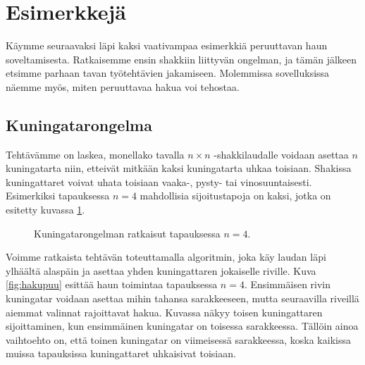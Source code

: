 \section{Esimerkkejä}

Käymme seuraavaksi läpi kaksi vaativampaa esimerkkiä
peruuttavan haun soveltamisesta.
Ratkaisemme ensin shakkiin liittyvän ongelman,
ja tämän jälkeen etsimme parhaan tavan
työtehtävien jakamiseen.
Molemmissa sovelluksissa näemme myös,
miten peruuttavaa hakua voi tehostaa.

\subsection{Kuningatarongelma}

Tehtävämme on laskea, monellako tavalla
$n \times n$ -shakkilaudalle voidaan asettaa $n$ kuningatarta
niin, etteivät mitkään kaksi kuningatarta uhkaa toisiaan.
Shakissa kuningattaret voivat uhata toisiaan
vaaka-, pysty- tai vinosuuntaisesti.
Esimerkiksi tapauksessa $n=4$ mahdollisia sijoitustapoja on kaksi,
jotka on esitetty kuvassa \ref{fig:kuning}.

\begin{figure}[h]
\center
{}
\caption{Kuningatarongelman ratkaisut tapauksessa $n=4$.}
\label{fig:kuning}
\end{figure}

Voimme ratkaista tehtävän toteuttamalla algoritmin,
joka käy laudan läpi ylhäältä alaspäin ja asettaa yhden kuningattaren
jokaiselle riville.
Kuva \ref{fig:hakupuu} esittää haun toimintaa tapauksessa $n=4$.
Ensimmäisen rivin kuningatar voidaan asettaa mihin tahansa sarakkeeseen,
mutta seuraavilla riveillä aiemmat valinnat rajoittavat hakua.
Kuvassa näkyy toisen kuningattaren sijoittaminen,
kun ensimmäinen kuningatar on toisessa sarakkeessa.
Tällöin ainoa vaihtoehto on, että toinen kuningatar on viimeisessä sarakkeessa,
koska kaikissa muissa tapauksissa kuningattaret uhkaisivat toisiaan.


